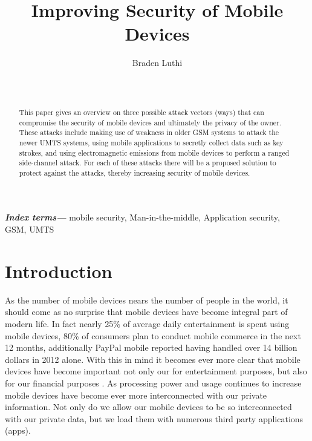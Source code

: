 \documentclass{sig-alternate}
\providecommand{\keywords}[1]{\textbf{\textit{Index terms---}} #1}
\begin{document}

\title{Improving Security of Mobile Devices}


\author{
\alignauthor
Braden Luthi\\
	\\
	\\
}

\maketitle
\begin{abstract}
	This paper gives an overview on three possible attack vectors (ways) that can compromise the security of mobile devices and ultimately the privacy of the owner. These attacks include making use of weakness in older GSM systems to attack the newer UMTS systems, using mobile applications to secretly collect data such as key strokes, and using electromagnetic emissions from mobile devices to perform a ranged side-channel attack. For each of these attacks there will be a proposed solution to protect against the attacks, thereby increasing security of mobile devices.
	
\end{abstract}
\keywords{mobile security, Man-in-the-middle, Application security,\\ GSM, UMTS}

\section{Introduction}

As the number of mobile devices nears the number of people in the world, it should come as no surprise that mobile devices have become integral part of modern life. In fact nearly 25\% of average daily entertainment is spent using mobile devices, 80\% of consumers plan to conduct mobile commerce in the next 12 months, additionally PayPal mobile reported having handled over 14 billion dollars in 2012 alone. With this in mind it becomes ever more clear that mobile devices have become important not only our for entertainment purposes, but also for our financial purposes \cite{mobile-usage}. As processing power and usage continues to increase mobile devices have become ever more interconnected with our private information.  Not only do we allow our mobile devices to be so interconnected with our private data, but we load them with numerous third party applications (apps).   
\end{document}
